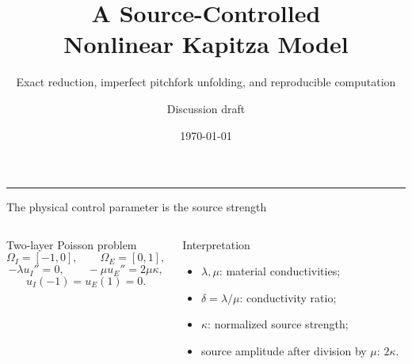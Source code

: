 \documentclass[aspectratio=169,11pt]{beamer}
\title{A Source-Controlled\\Nonlinear Kapitza Model}
\subtitle{Exact reduction, imperfect pitchfork unfolding, and reproducible computation}
\author{Discussion draft}
\date{\today}
\begin{document}
\begin{frame}[plain]
  \vfill
  \begin{center}
    {\color{navy}\inserttitle\par}
    \vspace{0.8em}
    {\color{graytext}\insertsubtitle\par}
    \vspace{1.8em}
    {\color{blue}\rule{0.46\textwidth}{1.2pt}}\par
    \vspace{1.2em}
    {\large\insertauthor}\par
    \vspace{0.35em}
    {\small\insertdate}
  \end{center}
  \vfill
\end{frame}

\begin{frame}{The physical control parameter is the source strength}
  \begin{columns}[T,onlytextwidth]
      \begin{block}{Two-layer Poisson problem}
      \[
        \Omega_I=[-1,0],\qquad \Omega_E=[0,1],
      \]
      \[
        -\lambda u_I''=0,\qquad
        -\mu u_E''=2\mu\kappa,
      \]
      \[
        u_I(-1)=u_E(1)=0.
      \]
      \end{block}
      \begin{block}{Interpretation}
        \begin{itemize}
          \item \(\lambda,\mu\): material conductivities;
          \item \(\delta=\lambda/\mu\): conductivity ratio;
          \item \(\kappa\): normalized source strength;
          \item source amplitude after division by \(\mu\): \(2\kappa\).
        \end{itemize}
      \end{block}
  \end{columns}
\end{frame}
\end{document}
